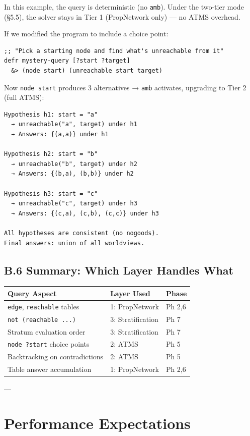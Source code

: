 \documentclass[11pt]{article}
\begin{document}
In this example, the query is deterministic (no \texttt{amb}). Under the two-tier
mode (§5.5), the solver stays in Tier 1 (PropNetwork only) — no ATMS
overhead.

If we modified the program to include a choice point:

\begin{verbatim}
;; "Pick a starting node and find what's unreachable from it"
defr mystery-query [?start ?target]
  &> (node start) (unreachable start target)
\end{verbatim}

Now \texttt{node start} produces 3 alternatives → \texttt{amb} activates, upgrading
to Tier 2 (full ATMS):

\begin{verbatim}
Hypothesis h1: start = "a"
  → unreachable("a", target) under h1
  → Answers: {(a,a)} under h1

Hypothesis h2: start = "b"
  → unreachable("b", target) under h2
  → Answers: {(b,a), (b,b)} under h2

Hypothesis h3: start = "c"
  → unreachable("c", target) under h3
  → Answers: {(c,a), (c,b), (c,c)} under h3

All hypotheses are consistent (no nogoods).
Final answers: union of all worldviews.
\end{verbatim}
\subsection{B.6 Summary: Which Layer Handles What}
\label{sec:org1e4b3ac}

\begin{center}
\begin{tabular}{lll}
Query Aspect & Layer Used & Phase\\
\hline
\texttt{edge}, \texttt{reachable} tables & 1: PropNetwork & Ph 2,6\\
\texttt{not (reachable ...)} & 3: Stratification & Ph 7\\
Stratum evaluation order & 3: Stratification & Ph 7\\
\texttt{node ?start} choice points & 2: ATMS & Ph 5\\
Backtracking on contradictions & 2: ATMS & Ph 5\\
Table answer accumulation & 1: PropNetwork & Ph 2,6\\
\end{tabular}
\end{center}

---
\section{Performance Expectations}
\label{sec:org6b7e237}
\end{document}
